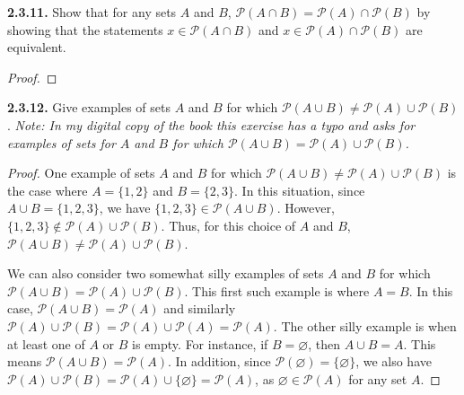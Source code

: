 \documentclass[12pt]{amsart}
\newenvironment{statement}[1]{\smallskip\noindent\color[rgb]{.6627, .3529, .6314} {\bf #1.}}{}
\theoremstyle{definition}
\theoremstyle{remark}
\begin{document}
\begin{statement}{2.3.11}
Show that for any sets $A$ and $B$,
$\mathscr{P}(A \cap B) = \mathscr{P}(A) \cap \mathscr{P}(B)$
by showing that the statements $x \in \mathscr{P}(A \cap B)$ and 
$x \in \mathscr{P}(A) \cap \mathscr{P}(B)$ are equivalent.
\end{statement}

\begin{proof}
\end{proof}


\begin{statement}{2.3.12}
Give examples of sets $A$ and $B$ for which
$\mathscr{P}(A \cup B) \neq \mathscr{P}(A) \cup \mathscr{P}(B)$.
\emph{Note: In my digital copy of the book this exercise has a typo and asks for examples 
of sets for $A$ and $B$ for which
$\mathscr{P}(A \cup B) = \mathscr{P}(A) \cup \mathscr{P}(B)$.}
\end{statement}

\begin{proof}
One example of sets $A$ and $B$ for which
$\mathscr{P}(A \cup B) \neq \mathscr{P}(A) \cup \mathscr{P}(B)$
is the case where $A = \{ 1, 2 \}$ and $B = \{ 2, 3 \}$.
In this situation, since $A \cup B = \{ 1, 2, 3 \}$, we have $\{ 1, 2, 3 \} \in \mathscr{P}(A \cup B)$.
However, $\{ 1, 2, 3 \} \notin \mathscr{P}(A) \cup \mathscr{P}(B)$.
Thus, for this choice of $A$ and $B$, 
$\mathscr{P}(A \cup B) \neq \mathscr{P}(A) \cup \mathscr{P}(B)$.

We can also consider two somewhat silly examples of sets $A$ and $B$ for which
$\mathscr{P}(A \cup B) = \mathscr{P}(A) \cup \mathscr{P}(B)$.
This first such example is where $A = B$.
In this case, $\mathscr{P}(A \cup B) = \mathscr{P}(A)$
and similarly $\mathscr{P}(A) \cup \mathscr{P}(B) = \mathscr{P}(A) \cup \mathscr{P}(A)
= \mathscr{P}(A)$.
The other silly example is when at least one of $A$ or $B$ is empty.
For instance, if $B =\varnothing$, then $A \cup B = A$.
This means $\mathscr{P}(A \cup B) = \mathscr{P}(A)$.
In addition, since $\mathscr{P}(\varnothing) = \{ \varnothing \}$,
we also have $\mathscr{P}(A) \cup \mathscr{P}(B) = \mathscr{P}(A) \cup \{ \varnothing \}
= \mathscr{P}(A)$, as $\varnothing \in \mathscr{P}(A)$ for any set $A$.
\end{proof}
\end{document}
